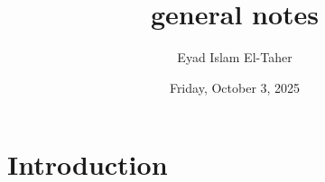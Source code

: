 \documentclass{article}
\title{general notes}
\date{Friday, October 3, 2025}
\author{Eyad Islam El-Taher}
\begin{document}
\maketitle

\section*{Introduction}
\end{document}
